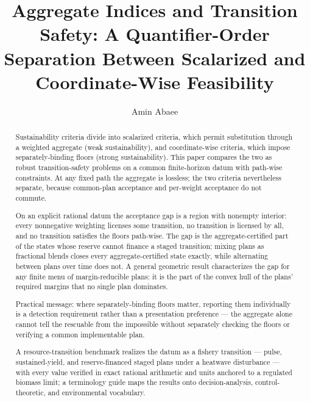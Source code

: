 \documentclass[3p,11pt]{elsarticle}
\begin{document}
\begin{frontmatter}

\title{Aggregate Indices and Transition Safety: A Quantifier-Order Separation Between Scalarized and Coordinate-Wise Feasibility}

\author[aff]{Amin Abaee}

\address[aff]{Independent Researcher, \href{https://orcid.org/0000-0002-0019-1842}{ORCID: 0000-0002-0019-1842}, \href{mailto:amin_abaee@ut.ac.ir}{amin\_abaee@ut.ac.ir}}

\begin{abstract}

Sustainability criteria divide into scalarized criteria, which permit
substitution through a weighted aggregate (weak sustainability), and
coordinate-wise criteria, which impose separately-binding floors (strong
sustainability). This paper compares the two as
robust transition-safety problems on a common finite-horizon datum with
path-wise constraints. At any fixed path the aggregate is lossless; the
two criteria nevertheless separate, because common-plan acceptance and
per-weight acceptance do not commute.

On an explicit rational datum the acceptance gap is a region with
nonempty interior: every nonnegative weighting licenses some transition,
no transition is licensed by all, and no transition satisfies the floors
path-wise. The gap is the aggregate-certified part of the states whose
reserve cannot finance a staged transition; mixing plans as fractional
blends closes every aggregate-certified state exactly, while alternating
between plans over time does not.
A general geometric result characterizes the gap for any finite menu of
margin-reducible plans: it is the part of the convex hull of the plans'
required margins that no single plan dominates.

Practical message: where separately-binding floors matter, reporting
them individually is a detection requirement rather than a presentation
preference --- the aggregate alone cannot tell the rescuable from the
impossible without separately checking the floors or verifying a common
implementable plan.

A resource-transition benchmark realizes the datum as a fishery
transition --- pulse, sustained-yield, and reserve-financed staged plans
under a heatwave disturbance --- with every value verified in exact
rational arithmetic and units anchored to a regulated biomass limit; a
terminology guide maps the results onto decision-analysis,
control-theoretic, and environmental vocabulary.


\end{abstract}
\end{frontmatter}
\end{document}

